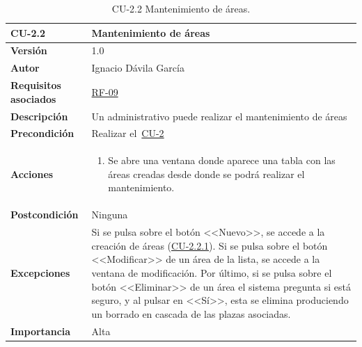 \begin{table}[p]
\label{table:CU-2.2}
	\centering
	\begin{tabularx}{\linewidth}{ p{} p{} }
		\toprule
		\textbf{CU-2.2}    & \textbf{Mantenimiento de áreas}\\
		\toprule
		\textbf{Versión}              & 1.0    \\
		\textbf{Autor}                & Ignacio Dávila García \\
		\textbf{Requisitos asociados} & \hyperref[itm:RF9]{RF-09} \\
		\textbf{Descripción}          & Un administrativo puede realizar el mantenimiento de áreas \\
		\textbf{Precondición}         & Realizar el~\hyperref[table:CU-2]{CU-2} \\
		\textbf{Acciones}             &
		\begin{enumerate}
			\def\labelenumi{\arabic{enumi}.}
			\tightlist
			\item Se abre una ventana donde aparece una tabla con las áreas creadas desde donde se podrá realizar el mantenimiento.
		\end{enumerate}\\
		\textbf{Postcondición}        & Ninguna \\
		\textbf{Excepciones}          & Si se pulsa sobre el botón <<Nuevo>>, se accede a la creación de áreas (\hyperref[table:CU-2.2.1]{CU-2.2.1}). Si se pulsa sobre el botón <<Modificar>> de un área de la lista, se accede a la ventana de modificación. Por último, si se pulsa sobre el botón <<Eliminar>> de un área el sistema pregunta si está seguro, y al pulsar en <<Sí>>, esta se elimina produciendo un borrado en cascada de las plazas asociadas. \\
		\textbf{Importancia}          & Alta \\
		\bottomrule
	\end{tabularx}
	\caption{CU-2.2 Mantenimiento de áreas.}
\end{table}
\FloatBarrier

